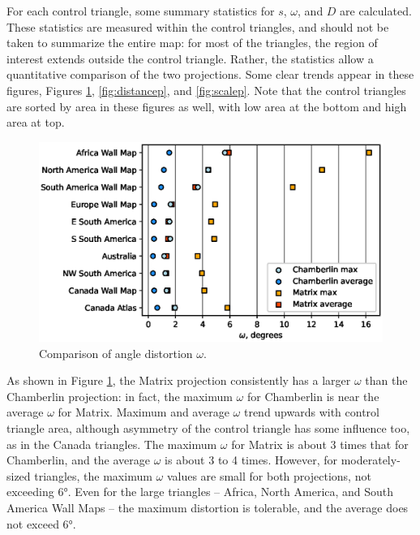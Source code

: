 \documentclass[]{interact}
\begin{document}
For each control triangle, some summary statistics for $s$, $\omega$, and $D$
are calculated. These statistics are measured within the control triangles, and
should not be taken to summarize the entire map: for most of the triangles,
the region of interest extends outside the control triangle. Rather, the
statistics allow a quantitative comparison of the two projections. Some clear
trends appear in these figures, Figures \ref{fig:omegap}, \ref{fig:distancep},
and \ref{fig:scalep}. Note that the control triangles are sorted by
area in these figures as well, with low area at the bottom and high area at top.

\begin{figure}
  \includegraphics[width=\textwidth]{omegaplot}
  \caption{Comparison of angle distortion $\omega$.}
  \label{fig:omegap}
\end{figure}

As shown in Figure \ref{fig:omegap}, the Matrix projection consistently has a
larger $\omega$ than the Chamberlin projection: in fact, the maximum $\omega$
for Chamberlin is near the average $\omega$ for Matrix. Maximum and average
$\omega$ trend upwards with control triangle area, although asymmetry of the
control triangle has some influence too, as in the Canada triangles.
The maximum $\omega$ for Matrix is about 3 times that for Chamberlin, and
the average $\omega$ is about 3 to 4 times. However, for
moderately-sized triangles, the maximum $\omega$ values are small for both
projections, not exceeding 6°. Even for the large triangles -- Africa, North
America, and South America Wall Maps -- the maximum distortion is tolerable,
and the average does not exceed 6°.
\end{document}
